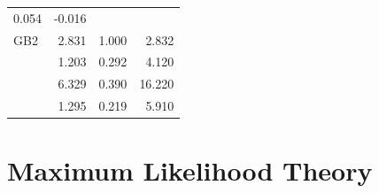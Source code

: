 \documentclass[]{book}
\theoremstyle{definition}
\theoremstyle{definition}
\theoremstyle{definition}
\theoremstyle{remark}
\begin{document}
\begin{longtable}[]{@{}lrrr@{}}
\begin{minipage}[t]{0.24\columnwidth}
0.054\strut
\end{minipage} & \begin{minipage}[t]{0.24\columnwidth}\raggedleft\strut
-0.016\strut
\end{minipage}\tabularnewline
GB2 & 2.831 & 1.000 & 2.832\tabularnewline
\begin{minipage}[t]{0.24\columnwidth}\raggedright\strut
\strut
\end{minipage} & \begin{minipage}[t]{0.24\columnwidth}\raggedleft\strut
1.203\strut
\end{minipage} & \begin{minipage}[t]{0.24\columnwidth}\raggedleft\strut
0.292\strut
\end{minipage} & \begin{minipage}[t]{0.24\columnwidth}\raggedleft\strut
4.120\strut
\end{minipage}\tabularnewline
\begin{minipage}[t]{0.24\columnwidth}\raggedright\strut
\strut
\end{minipage} & \begin{minipage}[t]{0.24\columnwidth}\raggedleft\strut
6.329\strut
\end{minipage} & \begin{minipage}[t]{0.24\columnwidth}\raggedleft\strut
0.390\strut
\end{minipage} & \begin{minipage}[t]{0.24\columnwidth}\raggedleft\strut
16.220\strut
\end{minipage}\tabularnewline
\begin{minipage}[t]{0.24\columnwidth}\raggedright\strut
\strut
\end{minipage} & \begin{minipage}[t]{0.24\columnwidth}\raggedleft\strut
1.295\strut
\end{minipage} & \begin{minipage}[t]{0.24\columnwidth}\raggedleft\strut
0.219\strut
\end{minipage} & \begin{minipage}[t]{0.24\columnwidth}\raggedleft\strut
5.910\strut
\end{minipage}\tabularnewline
\bottomrule
\end{longtable}

\section{Maximum Likelihood Theory}\label{maximum-likelihood-theory}
\end{document}
